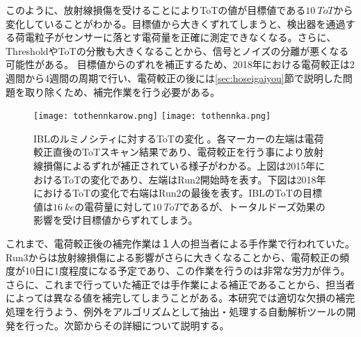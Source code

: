 
このように、放射線損傷を受けることによりToTの値が目標値である$10\ \si{ToT}$から変化していることがわかる。目標値から大きくずれてしまうと、検出器を通過する荷電粒子がセンサーに落とす電荷量を正確に測定できなくなる。さらに、ThresholdやToTの分散も大きくなることから、信号とノイズの分離が悪くなる可能性がある。
目標値からのずれを補正するため、2018年における電荷較正は2週間から4週間の周期で行い、電荷較正の後には\ref{sec:hoseigaiyou}節で説明した問題を取り除くため、補完作業を行う必要がある。

\begin{figure}[tbp]
  \centering
  \texttt{[image: tothennkarow.png]}
  \texttt{[image: tothennka.png]}
  \caption[ルミノシティに対するToTの変化]{IBLのルミノシティに対するToTの変化 。各マーカーの左端は電荷較正直後のToTスキャン結果であり、電荷較正を行う事により放射線損傷によるずれが補正されている様子がわかる。上図は2015年におけるToTの変化\cite{tothenkarow}であり、左端はRun2開始時を表す。下図は2018年におけるToTの変化\cite{tothennka}で右端はRun2の最後を表す。IBLのToTの目標値は$16\ \si{ke}$の電荷量に対して$10\ \si{ToT}$であるが、トータルドーズ効果の影響を受け目標値からずれてしまう。}
  \label{fig:thresholdhennka}
\end{figure}





これまで、電荷較正後の補完作業は１人の担当者による手作業で行われていた。Run3からは放射線損傷による影響がさらに大きくなることから、電荷較正の頻度が10日に1度程度になる予定であり、この作業を行うのは非常な労力が伴う。さらに、これまで行っていた補正では手作業による補正であることから、担当者によっては異なる値を補完してしまうことがある。本研究では適切な欠損の補完処理を行うよう、例外をアルゴリズムとして抽出・処理する自動解析ツールの開発を行った。次節からその詳細について説明する。


